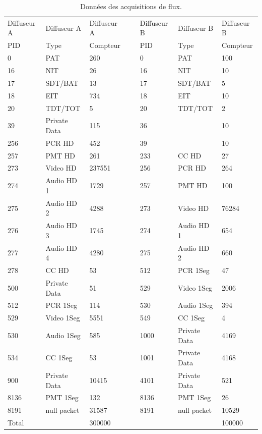 \documentclass[12pt,a4paper]{article}
\begin{document}
\begin{table}[b]
\centering
    \caption {Données des acquisitions de flux.}
    \begin{tabular}{|l|l|l|l|l|l|l|}
    \hline
     Diffuseur A  & Diffuseur A          & Diffuseur A    & ~ & Diffuseur B & Diffuseur B         & Diffuseur B   \\
    PID   & Type         & Compteur  & ~ & PID  & Type         & Compteur  \\ \hline
    0     & PAT          & 260    & ~ & 0    & PAT          & 100    \\ \hline
    16    & NIT          & 26     & ~ & 16   & NIT          & 10     \\ \hline
    17    & SDT/BAT      & 13     & ~ & 17   & SDT/BAT      & 5      \\ \hline
    18    & EIT          & 734    & ~ & 18   & EIT          & 10     \\ \hline
    20    & TDT/TOT      & 5      & ~ & 20   & TDT/TOT      & 2      \\ \hline
    39    & Private Data & 115    & ~ & 36   & ~            & 10     \\ \hline
    256   & PCR HD       & 452    & ~ & 39   & ~            & 10     \\ \hline
    257   & PMT HD       & 261    & ~ & 233  & CC HD        & 27     \\ \hline
    273   & Video HD     & 237551 & ~ & 256  & PCR HD       & 264    \\ \hline
    274   & Audio HD 1   & 1729   & ~ & 257  & PMT HD       & 100    \\ \hline
    275   & Audio HD 2   & 4288   & ~ & 273  & Video HD     & 76284  \\ \hline
    276   & Audio HD 3   & 1745   & ~ & 274  & Audio HD 1   & 654    \\ \hline
    277   & Audio HD 4   & 4280   & ~ & 275  & Audio HD 2   & 660    \\ \hline
    278   & CC HD        & 53     & ~ & 512  & PCR 1Seg     & 47     \\ \hline
    500   & Private Data & 51     & ~ & 529  & Video 1Seg   & 2006   \\ \hline
    512   & PCR 1Seg     & 114    & ~ & 530  & Audio 1Seg   & 394    \\ \hline
    529   & Video 1Seg   & 5551   & ~ & 549  & CC 1Seg      & 4      \\ \hline
    530   & Audio 1Seg   & 585    & ~ & 1000 & Private Data & 4169   \\ \hline
    534   & CC 1Seg      & 53     & ~ & 1001 & Private Data & 4168   \\ \hline
    900   & Private Data & 10415  & ~ & 4101 & Private Data & 521    \\ \hline
    8136  & PMT 1Seg     & 132    & ~ & 8136 & PMT 1Seg     & 26     \\ \hline
    8191  & null packet  & 31587  & ~ & 8191 & null packet  & 10529  \\ \hline
    Total & ~            & 300000 & ~ & ~    & ~            & 100000 \\ \hline
    \end{tabular}
	\label{tab_dumps}
\end{table}
\end{document}
